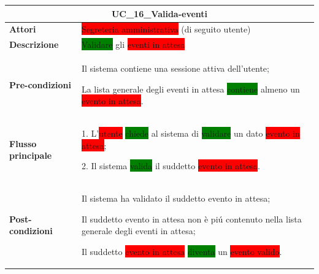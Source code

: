 \documentclass[11pt]{article}
\begin{document}
\begin{table}[H]
\centering
\begin{tabularx}{1\textwidth}{|l|X|}
\hline
\multicolumn{2}{|c|}{\textbf{UC\_16\_Valida-eventi}}\\
\hline \textbf{Attori} & \colorbox{red}{Segreteria amministrativa} (di seguito utente)\\
\hline \textbf{Descrizione} & \colorbox{green}{Validare} gli \colorbox{red}{eventi in attesa}\\
\hline \textbf{Pre-condizioni} & 
Il sistema contiene una sessione attiva dell'utente;

La lista generale degli eventi in attesa \colorbox{green}{contiene} almeno un \colorbox{red}{evento in attesa}.
\\
\hline \textbf{Flusso principale} & 
1. L'\colorbox{red}{utente} \colorbox{green}{chiede} al sistema di \colorbox{green}{validare} un dato \colorbox{red}{evento in attesa};

2. Il sistema \colorbox{green}{valida} il suddetto \colorbox{red}{evento in attesa}.
\\
\hline \textbf{Post-condizioni} & 
Il sistema ha validato il suddetto evento in attesa;

Il suddetto evento in attesa non è piú contenuto nella lista generale degli eventi in attesa;

Il suddetto \colorbox{red}{evento in attesa} \colorbox{green}{diventa} un \colorbox{red}{evento valido}.
\\
\hline
\end{tabularx}
\end{table}
\end{document}
